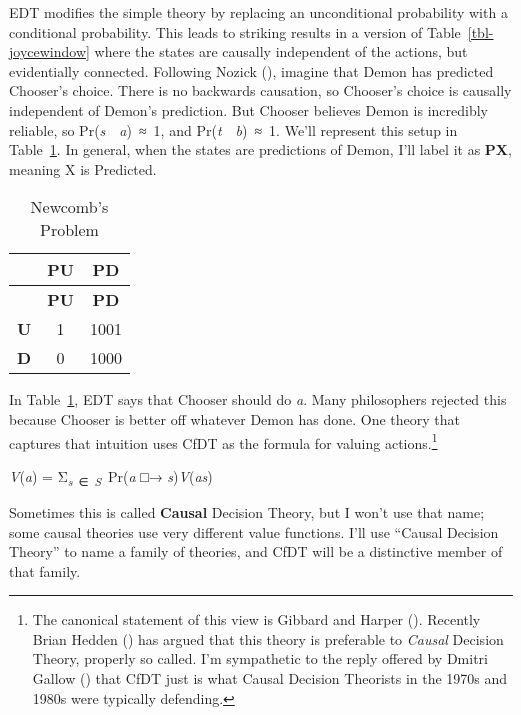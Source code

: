 \documentclass[
  10pt,
  letterpaper,
  DIV=11,
  numbers=noendperiod,
  twoside]{scrartcl}
\providecommand{\tightlist}{%
  \setlength{\itemsep}{0pt}\setlength{\parskip}{0pt}}\usepackage{longtable,booktabs,array}
\begin{document}
EDT modifies the simple theory by replacing an unconditional probability
with a conditional probability. This leads to striking results in a
version of Table~\ref{tbl-joycewindow} where the states are causally
independent of the actions, but evidentially connected. Following Nozick
(), imagine that Demon has predicted
Chooser's choice. There is no backwards causation, so Chooser's choice
is causally independent of Demon's prediction. But Chooser believes
Demon is incredibly reliable, so Pr(\emph{s}~\textbar~\emph{a})~≈~1, and
Pr(\emph{t}~\textbar~\emph{b})~≈~1. We'll represent this setup in
Table~\ref{tbl-newcomb}. In general, when the states are predictions of
Demon, I'll label it as \textbf{PX}, meaning X is Predicted.

\begin{longtable}[]{@{}ccc@{}}
\caption{Newcomb's Problem}\label{tbl-newcomb}\tabularnewline
\toprule\noalign{}
& \textbf{PU} & \textbf{PD} \\
\midrule\noalign{}
\endfirsthead
\toprule\noalign{}
& \textbf{PU} & \textbf{PD} \\
\midrule\noalign{}
\endhead
\bottomrule\noalign{}
\endlastfoot
\textbf{U} & 1 & 1001 \\
\textbf{D} & 0 & 1000 \\
\end{longtable}

In Table~\ref{tbl-newcomb}, EDT says that Chooser should do \emph{a}.
Many philosophers rejected this because Chooser is better off whatever
Demon has done. One theory that captures that intuition uses CfDT as the
formula for valuing actions.\footnote{The canonical statement of this
  view is Gibbard and Harper ().
  Recently Brian Hedden () has argued
  that this theory is preferable to \emph{Causal} Decision Theory,
  properly so called. I'm sympathetic to the reply offered by Dmitri
  Gallow () that CfDT just is what
  Causal Decision Theorists in the 1970s and 1980s were typically
  defending.}

\begin{description}
\tightlist
\item[CfDT]
\emph{V}(\emph{a}) = Σ\textsubscript{\emph{s}~∈~\emph{S}}~Pr(\emph{a} □→
\emph{s})\emph{V}(\emph{as})
\end{description}

Sometimes this is called \textbf{Causal} Decision Theory, but I won't
use that name; some causal theories use very different value functions.
I'll use ``Causal Decision Theory'' to name a family of theories, and
CfDT will be a distinctive member of that family.
\end{document}
